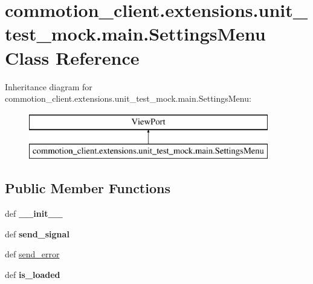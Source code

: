 \hypertarget{classcommotion__client_1_1extensions_1_1unit__test__mock_1_1main_1_1SettingsMenu}{\section{commotion\-\_\-client.\-extensions.\-unit\-\_\-test\-\_\-mock.\-main.\-Settings\-Menu Class Reference}
\label{classcommotion__client_1_1extensions_1_1unit__test__mock_1_1main_1_1SettingsMenu}
}
Inheritance diagram for commotion\-\_\-client.\-extensions.\-unit\-\_\-test\-\_\-mock.\-main.\-Settings\-Menu\-:\begin{figure}[H]
\begin{center}
\leavevmode
\includegraphics[height=2.000000cm]{classcommotion__client_1_1extensions_1_1unit__test__mock_1_1main_1_1SettingsMenu}
\end{center}
\end{figure}
\subsection*{Public Member Functions}
\begin{DoxyCompactItemize}
\item 
\hypertarget{classcommotion__client_1_1extensions_1_1unit__test__mock_1_1main_1_1SettingsMenu_adc3fb62d4e0b2011216723f07bd2694d}{def {\bfseries \-\_\-\-\_\-init\-\_\-\-\_\-}}\label{classcommotion__client_1_1extensions_1_1unit__test__mock_1_1main_1_1SettingsMenu_adc3fb62d4e0b2011216723f07bd2694d}

\item 
\hypertarget{classcommotion__client_1_1extensions_1_1unit__test__mock_1_1main_1_1SettingsMenu_a5e9a06e14061c35b87ffcc147f87ebb9}{def {\bfseries send\-\_\-signal}}\label{classcommotion__client_1_1extensions_1_1unit__test__mock_1_1main_1_1SettingsMenu_a5e9a06e14061c35b87ffcc147f87ebb9}

\item 
def \hyperlink{classcommotion__client_1_1extensions_1_1unit__test__mock_1_1main_1_1SettingsMenu_a12d8517f6e318038b3a57cf2f33907c4}{send\-\_\-error}
\item 
\hypertarget{classcommotion__client_1_1extensions_1_1unit__test__mock_1_1main_1_1SettingsMenu_ac74ab98887439dcafa298ab4610cb8c8}{def {\bfseries is\-\_\-loaded}}\label{classcommotion__client_1_1extensions_1_1unit__test__mock_1_1main_1_1SettingsMenu_ac74ab98887439dcafa298ab4610cb8c8}

\end{DoxyCompactItemize}
